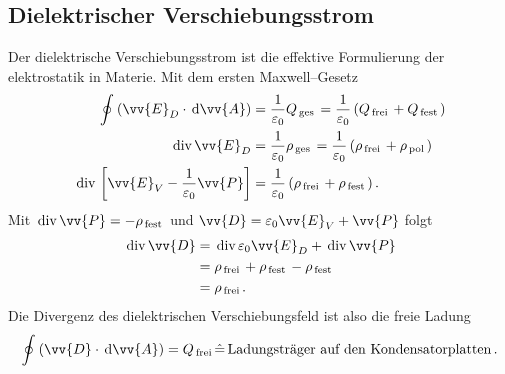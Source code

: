 \documentclass[a4paper,12pt]{article}
\newcommand{\td}{\,\text{d}}
\begin{document}
\subsection{Dielektrischer Verschiebungsstrom}
Der dielektrische Verschiebungsstrom ist die effektive Formulierung der elektrostatik in Materie. Mit dem ersten Maxwell--Gesetz
\begin{align*}
        \oint_{}^{}\left(\vv{E}_D\cdot \td \vv{A}\right)&=\dfrac{1}{\varepsilon _0}Q_{\,\text{ges}\,}=\dfrac{1}{\varepsilon _0}\left(Q_{\,\text{frei}\,}+Q_{\,\text{fest}\,}\right)\\
        \,\text{div}\,\vv{E}_D&=\dfrac{1}{\varepsilon _0}\rho _{\,\text{ges}\,}=\dfrac{1}{\varepsilon _0}\left(\rho _{\,\text{frei}\,}+\rho _{\,\text{pol}\,}\right)\\
        \,\text{div}\,\left[\vv{E}_V-\dfrac{1}{\varepsilon _0}\vv{P}\right]&=\dfrac{1}{\varepsilon _0}\left(\rho _{\,\text{frei}\,}+\rho _{\,\text{fest}\,}\right)
.\end{align*}
Mit $\,\text{div}\,\vv{P}=-\rho _{\,\text{fest}\,}$ und $\vv{D}=\varepsilon _0\vv{E}_V+\vv{P}$ folgt
\begin{align*}
        \,\text{div}\,\vv{D}&=\,\text{div}\,\varepsilon _0\vv{E}_D+\,\text{div}\,\vv{P}\\
                            &=\rho _{\,\text{frei}\,}+\rho _{\,\text{fest}\,}-\rho _{\,\text{fest}\,}\\
                            &=\rho _{\,\text{frei}\,}
.\end{align*}
Die Divergenz des dielektrischen Verschiebungsfeld ist also die freie Ladung
\[ 
        \oint_{}^{}\left(\vv{D}\cdot \td \vv{A}\right)=Q_{\,\text{frei}\,}\hat{=}\,\text{Ladungsträger auf den Kondensatorplatten}\,
.\] 
\end{document}

